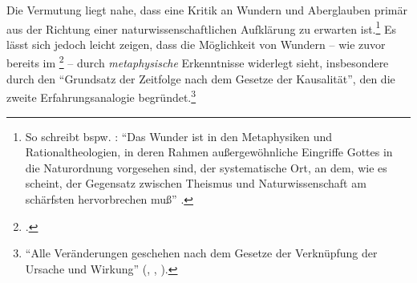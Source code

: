 \label{BestimmungdesBegriffsAberglaube}
Die Vermutung liegt nahe, dass eine Kritik an Wundern und Aberglauben primär aus
der Richtung einer naturwissenschaftlichen Aufklärung zu erwarten
ist.\footnote{So schreibt bspw.
: \enquote{Das Wunder ist
in den Metaphysiken und Rationaltheologien, in deren Rahmen außergewöhnliche
Eingriffe Gottes in die Naturordnung vorgesehen sind, der systematische Ort, an
dem, wie es scheint, der Gegensatz zwischen Theismus und Naturwissenschaft am
schärfsten hervorbrechen muß}
\parencite[][268]{Schroeder:UrspruengedesAtheismus1998}.} Es lässt sich jedoch
leicht zeigen, dass  die Möglichkeit von Wundern -- wie
zuvor bereits
 im \footnote{\cite[Vgl.][III:
82.26--84.19]{Spinoza:SpinozaOpera1972}.} -- durch \emph{metaphysische}
Erkenntnisse widerlegt sieht, insbesondere durch den \enquote{Grundsatz der
Zeitfolge nach dem Gesetze der Kausalität}, den die zweite Erfahrungsanalogie
begründet.\footnote{\enquote{Alle Veränderungen geschehen nach dem Gesetze der
Verknüpfung der Ursache und Wirkung} \mkbibparens{\cite[][B
232]{Kant:KritikderreinenVernunft2003}, \cite[][III:
166.32--33]{Kant:GesammelteWerke1900ff.}, \ohio}.}

